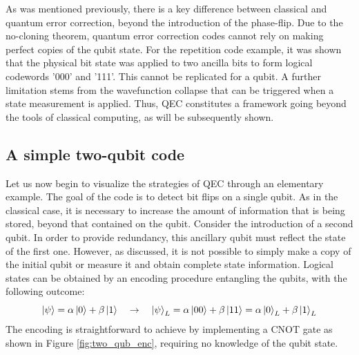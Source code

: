 As was mentioned previously, there is a key difference between classical and quantum error correction, beyond the introduction of the phase-flip. Due to the no-cloning theorem, quantum error correction codes cannot rely on making perfect copies of the qubit state. For the repetition code example, it was shown that the physical bit state was applied to two ancilla bits to form logical codewords '000' and '111'. This cannot be replicated for a qubit. A further limitation stems from the wavefunction collapse that can be triggered when a state measurement is applied\cite{Girvin2021,Gottesman2009,Devitt2013,Roffe2019}. Thus, QEC constitutes a framework going beyond the tools of classical computing, as will be subsequently shown.

\subsection{A simple two-qubit code}

Let us now begin to visualize the strategies of QEC through an elementary example. The goal of the code is to detect bit flips on a single qubit. As in the classical case, it is necessary to increase the amount of information that is being stored, beyond that contained on the qubit. Consider the introduction of a second qubit. In order to provide redundancy, this ancillary qubit must reflect the state of the first one. However, as discussed, it is not possible to simply make a copy of the initial qubit or measure it and obtain complete state information. Logical states can be obtained by an encoding procedure entangling the qubits, with the following outcome:
\begin{equation}
    \ket{\psi}= \alpha \ket{0} +\beta \ket{1} \quad \rightarrow \quad \ket{\psi}_L = \alpha \ket{00} +\beta \ket{11}=\alpha \ket{0}_L +\beta \ket{1}_L
\end{equation}
The encoding is straightforward to achieve by implementing a CNOT gate as shown in Figure \ref{fig:two_qub_enc}, requiring no knowledge of the qubit state.


